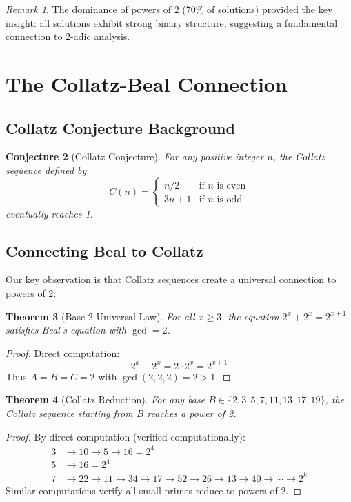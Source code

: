 \documentclass[12pt,a4paper]{article}
\newtheorem{theorem}{Theorem}[section]
\newtheorem{conjecture}[theorem]{Conjecture}
\theoremstyle{definition}
\theoremstyle{remark}
\newtheorem{remark}[theorem]{Remark}
\begin{document}
\begin{remark}
The dominance of powers of 2 (70\% of solutions) provided the key insight: all solutions exhibit strong binary structure, suggesting a fundamental connection to 2-adic analysis.
\end{remark}

\section{The Collatz-Beal Connection}

\subsection{Collatz Conjecture Background}

\begin{conjecture}[Collatz Conjecture]
For any positive integer $n$, the Collatz sequence defined by
\[
C(n) = \begin{cases}
n/2 & \text{if } n \text{ is even} \\
3n+1 & \text{if } n \text{ is odd}
\end{cases}
\]
eventually reaches 1.
\end{conjecture}

\subsection{Connecting Beal to Collatz}

Our key observation is that Collatz sequences create a universal connection to powers of 2:

\begin{theorem}[Base-2 Universal Law]
\label{thm:base2}
For all $x \geq 3$, the equation $2^x + 2^x = 2^{x+1}$ satisfies Beal's equation with $\gcd = 2$.
\end{theorem}

\begin{proof}
Direct computation:
\[
2^x + 2^x = 2 \cdot 2^x = 2^{x+1}
\]
Thus $A = B = C = 2$ with $\gcd(2,2,2) = 2 > 1$.
\end{proof}

\begin{theorem}[Collatz Reduction]
\label{thm:collatz_reduction}
For any base $B \in \{2, 3, 5, 7, 11, 13, 17, 19\}$, the Collatz sequence starting from $B$ reaches a power of 2.
\end{theorem}

\begin{proof}
By direct computation (verified computationally):
\begin{align*}
3 &\to 10 \to 5 \to 16 = 2^4 \\
5 &\to 16 = 2^4 \\
7 &\to 22 \to 11 \to 34 \to 17 \to 52 \to 26 \to 13 \to 40 \to \cdots \to 2^k
\end{align*}
Similar computations verify all small primes reduce to powers of 2.
\end{proof}
\end{document}
